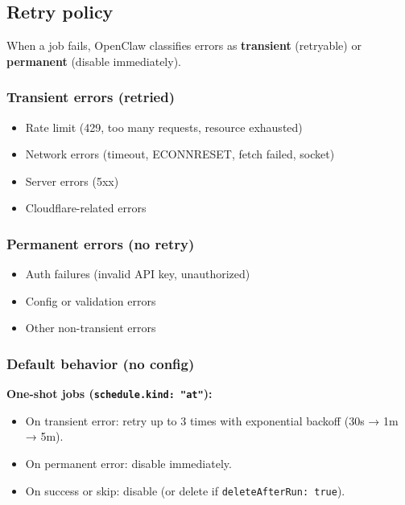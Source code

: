 \subsection{Retry policy}


When a job fails, OpenClaw classifies errors as \textbf{transient} (retryable) or \textbf{permanent} (disable immediately).

\subsubsection{Transient errors (retried)}


\begin{itemize}
  \item Rate limit (429, too many requests, resource exhausted)
  \item Network errors (timeout, ECONNRESET, fetch failed, socket)
  \item Server errors (5xx)
  \item Cloudflare-related errors
\end{itemize}


\subsubsection{Permanent errors (no retry)}


\begin{itemize}
  \item Auth failures (invalid API key, unauthorized)
  \item Config or validation errors
  \item Other non-transient errors
\end{itemize}


\subsubsection{Default behavior (no config)}


\textbf{One-shot jobs (\texttt{schedule.kind: "at"}):}

\begin{itemize}
  \item On transient error: retry up to 3 times with exponential backoff (30s → 1m → 5m).
  \item On permanent error: disable immediately.
  \item On success or skip: disable (or delete if \texttt{deleteAfterRun: true}).
\end{itemize}


